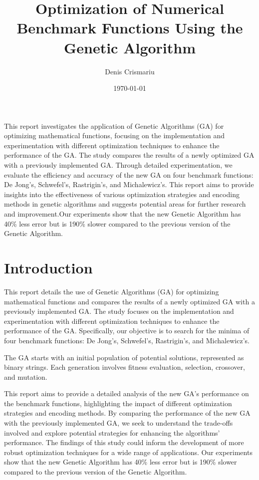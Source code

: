 \documentclass{article}
\title{Optimization of Numerical Benchmark Functions Using the Genetic Algorithm}
\author{Denis Crismariu}
\date{\today}
\begin{document}
\maketitle

\abstract

This report investigates the application of Genetic Algorithms (GA) for optimizing mathematical functions, focusing on the implementation and experimentation with different optimization techniques to enhance the performance of the GA. The study compares the results of a newly optimized GA with a previously implemented GA. Through detailed experimentation, we evaluate the efficiency and accuracy of the new GA on four benchmark functions: De Jong’s, Schwefel’s, Rastrigin’s, and Michalewicz’s. This report aims to provide insights into the effectiveness of various optimization strategies and encoding methods in genetic algorithms and suggests potential areas for further research and improvement.Our experiments show that the new Genetic Algorithm has 40\% less error but is 190\% slower compared to the previous version of the Genetic Algorithm.

\section{Introduction}
This report details the use of Genetic Algorithms (GA) for optimizing mathematical functions and compares the results of a newly optimized GA with a previously implemented GA. The study focuses on the implementation and experimentation with different optimization techniques to enhance the performance of the GA. Specifically, our objective is to search for the minima of four benchmark functions: De Jong’s, Schwefel’s, Rastrigin’s, and Michalewicz’s.

The GA starts with an initial population of potential solutions, represented as binary strings. Each generation involves fitness evaluation, selection, crossover, and mutation.

This report aims to provide a detailed analysis of the new GA's performance on the benchmark functions, highlighting the impact of different optimization strategies and encoding methods. By comparing the performance of the new GA with the previously implemented GA, we seek to understand the trade-offs involved and explore potential strategies for enhancing the algorithms' performance. The findings of this study could inform the development of more robust optimization techniques for a wide range of applications. Our experiments show that the new Genetic Algorithm has 40\% less error but is 190\% slower compared to the previous version of the Genetic Algorithm.
\end{document}
